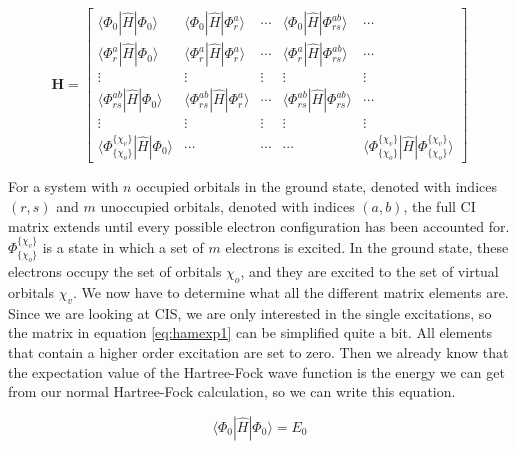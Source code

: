 \documentclass[twoside,twocolumn,9pt]{article}
\begin{document}
\begin{equation}\label{eq:hamexp1}
  \boldsymbol{H} = \begin{bmatrix}
    \langle \Phi_0 | \hat{H} | \Phi_0 \rangle         & \langle \Phi_0 | \hat{H} | \Phi_r^a \rangle         & \cdots & \langle \Phi_0 | \hat{H} | \Phi_{rs}^{ab} \rangle         & \cdots \\
    \langle \Phi_r^a | \hat{H} | \Phi_0 \rangle       & \langle \Phi_r^a | \hat{H} | \Phi_r^a \rangle       & \cdots & \langle \Phi_r^a |\hat{H} | \Phi_{rs}^{ab} \rangle        & \cdots \\
    \vdots                                            & \vdots                                              & \vdots & \vdots                                                    & \vdots \\
    \langle \Phi_{rs}^{ab} | \hat{H} | \Phi_0 \rangle & \langle \Phi_{rs}^{ab} | \hat{H} | \Phi_r^a \rangle & \cdots & \langle \Phi_{rs}^{ab} | \hat{H} | \Phi_{rs}^{ab} \rangle & \cdots \\
    \vdots                                            & \vdots                                              & \vdots & \vdots & \vdots \\
    \langle \Phi_{\{\chi_o\}}^{\{\chi_v\}} | \hat{H} | \Phi_0 \rangle & \cdots & \cdots & \cdots & \langle \Phi_{\{\chi_o\}}^{\{\chi_v\}} | \hat{H} | \Phi_{\{\chi_o\}}^{\{\chi_v\}} \rangle
  \end{bmatrix}
\end{equation}

For a system with $n$ occupied orbitals in the ground state, denoted with indices $(r, s)$ and $m$ unoccupied orbitals, denoted with indices $(a,b)$, the full CI matrix extends until
every possible electron configuration has been accounted for. $\Phi_{\{\chi_o\}}^{\{\chi_v\}}$ is a state in which a set of $m$ electrons is excited. In the ground state, these 
electrons occupy the set of orbitals {$\chi_o$}, and they are excited to the set of virtual orbitals {$\chi_v$}.
We now have to determine what all the different matrix elements are. Since we are looking at CIS, we are only interested in the single excitations, so the matrix in equation
\eqref{eq:hamexp1} can be simplified quite a bit. All elements that contain a higher order excitation are set to zero. Then we already know that the expectation value of the Hartree-Fock wave function is the energy we can get from our normal
Hartree-Fock calculation, so we can write this equation.

\begin{equation}\label{eq:E0}
  \langle \Phi_0 | \hat{H} | \Phi_0 \rangle = E_0
\end{equation}
\end{document}
